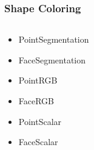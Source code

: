 \documentclass[compress]{beamer}
\begin{document}
\begin{frame}
\frametitle{Shape Coloring}

\begin{columns}
\begin{column}{.4\linewidth}
\begin{itemize}
\item<1> PointSegmentation
\item<1> FaceSegmentation
\item<2> PointRGB
\item<2> FaceRGB
\item<3> PointScalar
\item<3> FaceScalar
\end{itemize}
\end{column}
\begin{column}{.6\linewidth}

\begin{figure}[h]
\centering
{}
\end{figure}

\end{column}
\end{columns}

\end{frame}
\end{document}
